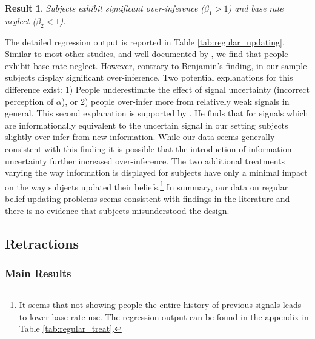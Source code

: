 \documentclass{article}
\newtheorem{result}{Result}
\newenvironment{Result}{\begin{result} \rm }{\end{result}}
\begin{document}
\begin{Result}
Subjects exhibit significant over-inference ($\beta_1>1$) and base rate neglect ($\beta_2<1$).
\end{Result}

The detailed regression output is reported in Table \ref{tab:regular_updating}. Similar to most other studies, and well-documented by \cite{Benjamin2019}, we find that people exhibit base-rate neglect. However, contrary to Benjamin's finding, in our sample subjects display significant over-inference. Two potential explanations for this difference exist: 1) People underestimate the effect of signal uncertainty (incorrect perception of $\alpha$), or 2) people over-infer more from relatively weak signals in general. This second explanation is supported by \cite{Thaler2021}. He finds that for signals which are informationally equivalent to the uncertain signal in our setting subjects slightly over-infer from new information. While our data seems generally consistent with this finding it is possible that the introduction of information uncertainty further increased over-inference. The two additional treatments varying the way information is displayed for subjects have only a minimal impact on the way subjects updated their beliefs.\footnote{It seems that not showing people the entire history of previous signals leads to lower base-rate use. The regression output can be found in the appendix in Table \ref{tab:regular_treat}.} In summary, our data on regular belief updating problems seems consistent with findings in the literature and there is no evidence that subjects misunderstood the design.


\subsection{Retractions}

\subsubsection{Main Results}
\end{document}
